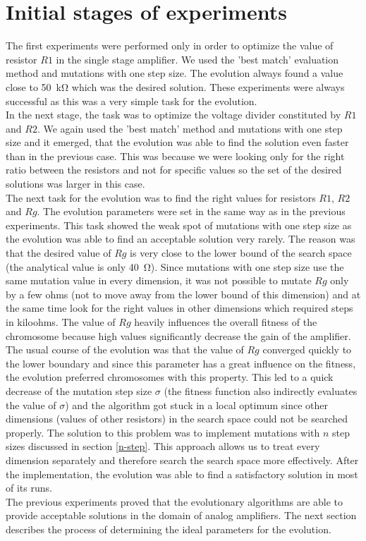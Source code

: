 \section{Initial stages of experiments}
The first experiments were performed only in order to optimize the value of resistor $R1$ in the single stage amplifier. We used the 'best match' evaluation method and mutations with one step size. The evolution always found a value close to \SI{50}{\kilo\ohm} which was the desired solution. These experiments were always successful as this was a very simple task for the evolution.\\
In the next stage, the task was to optimize the voltage divider constituted by $R1$ and $R2$. We again used the 'best match' method and mutations with one step size and it emerged, that the evolution was able to find the solution even faster than in the previous case. This was because we were looking only for the right ratio between the resistors and not for specific values so the set of the desired solutions was larger in this case.\\
The next task for the evolution was to find the right values for resistors $R1$, $R2$ and $Rg$. The evolution parameters were set in the same way as in the previous experiments. This task showed the weak spot of mutations with one step size as the evolution was able to find an acceptable solution very rarely. The reason was that the desired value of $Rg$ is very close to the lower bound of the search space (the analytical value is only \SI{40}{\ohm}). Since mutations with one step size use the same mutation value in every dimension, it was not possible to mutate $Rg$ only by a few ohms (not to move away from the lower bound of this dimension) and at the same time look for the right values in other dimensions which required steps in kiloohms. The value of $Rg$ heavily influences the overall fitness of the chromosome because high values significantly decrease the gain of the amplifier. The usual course of the evolution was that the value of $Rg$ converged quickly to the lower boundary and since this parameter has a great influence on the fitness, the evolution preferred chromosomes with this property. This led to a quick decrease of the mutation step size $\sigma$ (the fitness function also indirectly evaluates the value of $\sigma$) and the algorithm got stuck in a local optimum since other dimensions (values of other resistors) in the search space could not be searched properly. The solution to this problem was to implement mutations with $n$ step sizes discussed in section \ref{n-step}. This approach allows us to treat every dimension separately and therefore search the search space more effectively. After the implementation, the evolution was able to find a satisfactory solution in most of its runs.\\
The previous experiments proved that the evolutionary algorithms are able to provide acceptable solutions in the domain of analog amplifiers. The next section describes the process of determining the ideal parameters for the evolution.

